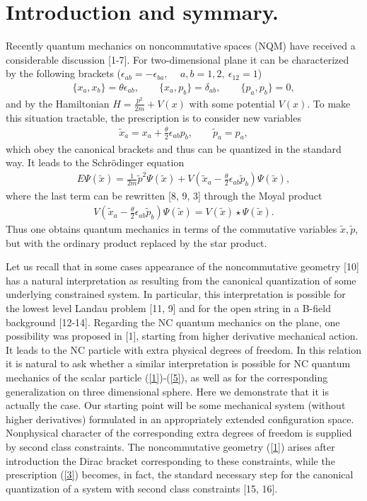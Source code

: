 \documentclass[paper a4]{article}
\begin{document}
\section{Introduction and symmary.}
Recently quantum mechanics on noncommutative spaces (NQM) have received a
considerable discussion [1-7]. For two-dimensional plane it can be
characterized by the following brackets
($\epsilon_{ab}=-\epsilon_{ba},$ ~  $a, b=1,2, ~ \epsilon_{12}=1$)
\begin{eqnarray}\label{1}
\{x_a, x_b\}=\theta\epsilon_{ab}, \qquad
\{x_a, p_b\}=\delta_{ab}, \qquad
\{p_a, p_b\}=0,
\end{eqnarray}
and by the Hamiltonian $H=\frac{p^2}{2m}+V(x)$
with some potential $V(x)$. To make this situation tractable, the
prescription is to consider new variables
\begin{eqnarray}\label{3}
\tilde x_a=x_a+\frac{\theta}{2}\epsilon_{ab}p_b, \qquad \tilde p_a=p_a,
\end{eqnarray}
which obey the canonical brackets and thus can be quantized in the
standard way. It leads to the
Schr\"{o}dinger
equation
\begin{eqnarray}\label{4}
E\Psi(\tilde x)=\frac{1}{2m}\tilde p^2\Psi(\tilde x)+
V(\tilde x_a-\frac{\theta}{2}\epsilon_{ab}\tilde p_b)\Psi(\tilde x),
\end{eqnarray}
where the last term can be rewritten [8, 9, 3] through the Moyal product
\begin{eqnarray}\label{5}
V(\tilde x_a-\frac{\theta}{2}\epsilon_{ab}\tilde p_b)\Psi(\tilde x)=
V(\tilde x)\star\Psi(\tilde x).
\end{eqnarray}
Thus one obtains quantum mechanics in terms of the commutative variables
$\tilde x, \tilde p$, but  with the ordinary product replaced by the star
product.

Let us recall that in some cases appearance of the noncommutative
geometry [10] has a natural interpretation as
resulting from the canonical
quantization of some underlying constrained system. In particular, this
interpretation is possible for the lowest level Landau problem [11, 9]
and for the open string in a B-field background [12-14]. Regarding the
NC quantum mechanics on the plane, one possibility was proposed in [1],
starting from higher
derivative mechanical action. It leads to the NC particle
with extra physical degrees of freedom. In this relation it is natural
to ask whether a similar interpretation is possible for NC quantum
mechanics of the scalar particle (\ref{1})-(\ref{5}), as well as for
the corresponding generalization on three dimensional sphere. Here we
demonstrate that it is actually the case.
Our starting point will be some mechanical system (without higher
derivatives) formulated in
an appropriately extended configuration space. Nonphysical character of
the corresponding extra degrees of freedom is supplied by second
class constraints.
The noncommutative geometry (\ref{1})
arises after introduction the Dirac bracket corresponding to these
constraints, while the
prescription (\ref{3}) becomes, in fact, the standard necessary step
for the canonical quantization of a system with second class constraints
[15, 16].
\end{document}
